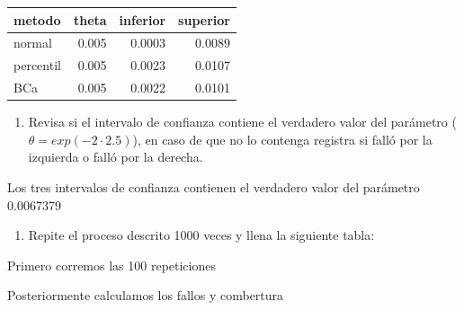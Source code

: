 \documentclass[]{article}
\newenvironment{Shaded}{\begin{snugshade}}{\end{snugshade}}
\newcommand{\DataTypeTok}[1]{\textcolor[rgb]{0.13,0.29,0.53}{#1}}
\newcommand{\DecValTok}[1]{\textcolor[rgb]{0.00,0.00,0.81}{#1}}
\newcommand{\FloatTok}[1]{\textcolor[rgb]{0.00,0.00,0.81}{#1}}
\newcommand{\KeywordTok}[1]{\textcolor[rgb]{0.13,0.29,0.53}{\textbf{#1}}}
\newcommand{\NormalTok}[1]{#1}
\newcommand{\OperatorTok}[1]{\textcolor[rgb]{0.81,0.36,0.00}{\textbf{#1}}}
\newcommand{\StringTok}[1]{\textcolor[rgb]{0.31,0.60,0.02}{#1}}
\providecommand{\tightlist}{%
  \setlength{\itemsep}{0pt}\setlength{\parskip}{0pt}}
\begin{document}
\begin{longtable}[]{@{}lrrr@{}}
\toprule
metodo & theta & inferior & superior\tabularnewline
\midrule
\endhead
normal & 0.005 & 0.0003 & 0.0089\tabularnewline
percentil & 0.005 & 0.0023 & 0.0107\tabularnewline
BCa & 0.005 & 0.0022 & 0.0101\tabularnewline
\bottomrule
\end{longtable}

\begin{enumerate}
\def\labelenumi{\roman{enumi})}
\setcounter{enumi}{2}
\tightlist
\item
  Revisa si el intervalo de confianza contiene el verdadero valor del
  parámetro (\(\theta=exp(-2\cdot2.5)\)), en caso de que no lo contenga
  registra si falló por la izquierda o falló por la derecha.
\end{enumerate}

Los tres intervalos de confianza contienen el verdadero valor del
parámetro 0.0067379

\begin{enumerate}
\def\labelenumi{\alph{enumi})}
\tightlist
\item
  Repite el proceso descrito 1000 veces y llena la siguiente tabla:
\end{enumerate}

Primero corremos las 100 repeticiones

\begin{Shaded}
\end{Shaded}

Posteriormente calculamos los fallos y combertura

\begin{Shaded}
\end{Shaded}
\end{document}
